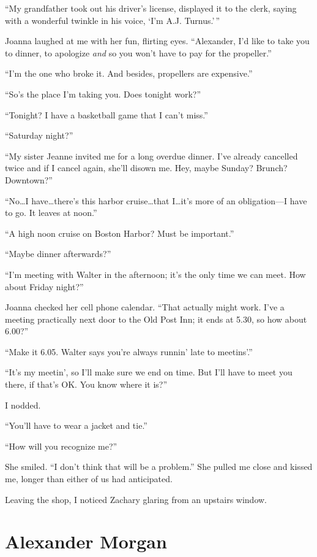 ``My grandfather took out his driver's license, displayed it to the
clerk, saying with a wonderful twinkle in his voice, `I'm A.J.
Turnus.'\,''

Joanna laughed at me with her fun, flirting eyes. ``Alexander, I'd like
to take you to dinner, to apologize \emph{and} so you won't have to pay
for the propeller.''

``I'm the one who broke it. And besides, propellers are expensive.''

``So's the place I'm taking you. Does tonight work?''

``Tonight? I have a basketball game that I can't miss.''

``Saturday night?''

``My sister Jeanne invited me for a long overdue dinner. I've already
cancelled twice and if I cancel again, she'll disown me. Hey, maybe
Sunday? Brunch? Downtown?''

``No\ldots I have\ldots there's this harbor cruise\ldots that
I\ldots it's more of an obligation---I have to go. It leaves at noon.''

``A high noon cruise on Boston Harbor? Must be important.''

``Maybe dinner afterwards?''

``I'm meeting with Walter in the afternoon; it's the only time we can
meet. How about Friday night?''

Joanna checked her cell phone calendar. ``That actually might work. I've
a meeting practically next door to the Old Post Inn; it ends at 5.30, so
how about 6.00?''

``Make it 6.05. Walter says you're always runnin' late to meetins'.''

``It's my meetin', so I'll make sure we end on time. But I'll have to
meet you there, if that's OK. You know where it is?''

I nodded.

``You'll have to wear a jacket and tie.''

``How will you recognize me?''

She smiled. ``I don't think that will be a problem.'' She pulled me
close and kissed me, longer than either of us had anticipated.

Leaving the shop, I noticed Zachary glaring from an upstairs window.

\chapter{Alexander Morgan}


